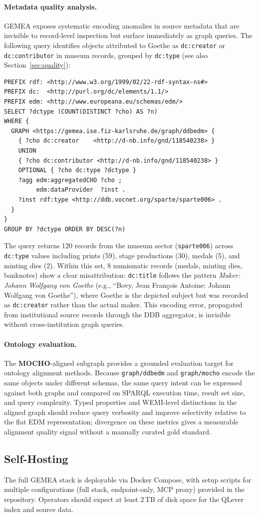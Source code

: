 \paragraph{Metadata quality analysis.}
GEMEA exposes systematic encoding anomalies in source metadata that are invisible to record-level inspection but surface immediately as graph queries.
The following query identifies objects attributed to Goethe as \texttt{dc:creator} or \texttt{dc:contributor} in museum records, grouped by \texttt{dc:type} (see also Section~\ref{sec:quality}):
\begin{lstlisting}[language=SPARQL, basicstyle=\ttfamily\small, breaklines=true]
PREFIX rdf: <http://www.w3.org/1999/02/22-rdf-syntax-ns#>
PREFIX dc:  <http://purl.org/dc/elements/1.1/>
PREFIX edm: <http://www.europeana.eu/schemas/edm/>
SELECT ?dctype (COUNT(DISTINCT ?cho) AS ?n)
WHERE {
  GRAPH <https://gemea.ise.fiz-karlsruhe.de/graph/ddbedm> {
    { ?cho dc:creator    <http://d-nb.info/gnd/118540238> }
    UNION
    { ?cho dc:contributor <http://d-nb.info/gnd/118540238> }
    OPTIONAL { ?cho dc:type ?dctype }
    ?agg edm:aggregatedCHO ?cho ;
         edm:dataProvider  ?inst .
    ?inst rdf:type <http://ddb.vocnet.org/sparte/sparte006> .
  }
}
GROUP BY ?dctype ORDER BY DESC(?n)
\end{lstlisting}
The query returns 120 records from the museum sector (\texttt{sparte006}) across \texttt{dc:type} values including prints (59), stage productions (30), medals (5), and minting dies (2).
Within this set, 8 numismatic records (medals, minting dies, banknotes) show a clear misattribution: \texttt{dc:title} follows the pattern \emph{Maker: Johann Wolfgang von Goethe} (e.g., ``Bovy, Jean Fran\c{c}ois Antoine: Johann Wolfgang von Goethe''), where Goethe is the depicted subject but was recorded as \texttt{dc:creator} rather than the actual maker.
This encoding error, propagated from institutional source records through the DDB aggregator, is invisible without cross-institution graph queries.

\paragraph{Ontology evaluation.}
The \textbf{MOCHO}-aligned subgraph provides a grounded evaluation target for ontology alignment methods.
Because \texttt{graph/ddbedm} and \texttt{graph/mocho} encode the same objects under different schemas, the same query intent can be expressed against both graphs and compared on SPARQL execution time, result set size, and query complexity.
Typed properties and WEMI-level distinctions in the aligned graph should reduce query verbosity and improve selectivity relative to the flat EDM representation; divergence on these metrics gives a measurable alignment quality signal without a manually curated gold standard.

\subsection{Self-Hosting}
The full GEMEA stack is deployable via Docker Compose, with setup scripts for multiple configurations (full stack, endpoint-only, MCP proxy) provided in the repository.
Operators should expect at least 2\,TB of disk space for the QLever index and source data.
